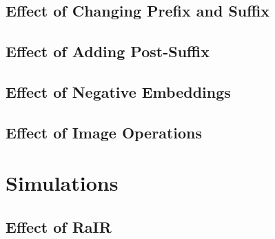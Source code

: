 \subsection{Effect of Changing Prefix and Suffix}
\label{sec:prefix-suffix}


\subsection{Effect of Adding Post-Suffix}
\label{sec:post-suffix}


\subsection{Effect of Negative Embeddings}
\label{sec:negative-embeddings}


\subsection{Effect of Image Operations}
\label{sec:image-operations}



\section{Simulations}
\label{sec:simulations}


\subsection{Effect of RaIR}
\label{sec:effect-rair}

